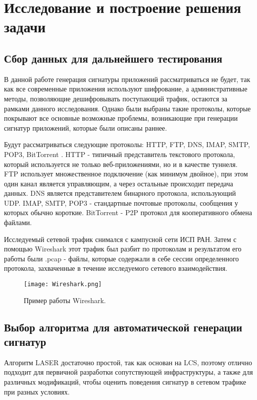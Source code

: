 \section{Исследование и построение решения задачи}
\label{sec:Section3} 

\subsection{Сбор данных для дальнейшего тестирования}

В данной работе генерация сигнатуры приложений рассматриваться не будет,
так как все современные приложения используют шифрование, а административные методы,
позволяющие дешифровывать поступающий трафик, остаются за рамками данного исследования.
Однако были выбраны такие протоколы, которые покрывают все основные возможные проблемы,
возникающие при генерации сигнатур приложений, которые были описаны раннее.

Будут рассматриваться следующие протоколы: HTTP, FTP, DNS, IMAP, SMTP, POP3, BitTorrent \cite{Bittorent}.
HTTP - типичный представитель текстового протокола, который используется не только веб-приложениями,
но и в качестве туннеля.
FTP использует множественное подключение (как минимум двойное), при этом один канал является управляющим,
а через остальные происходит передача данных. DNS является представителем бинарного протокола, использующий UDP.
IMAP, SMTP, POP3 - стандартные почтовые протоколы, сообщения у которых обычно короткие.
BitTorrent - P2P протокол для кооперативного обмена файлами.

Исследуемый сетевой трафик снимался с кампусной сети ИСП РАН. Затем с помощью Wireshark \cite{Wireshark}
этот трафик был разбит по протоколам и результатом его работы были .pcap - файлы,
которые содержали в себе сессии определенного протокола, захваченные в течение исследуемого сетевого взаимодействия.

\begin{figure}[H]
    \begin{center}
        \texttt{[image: Wireshark.png]}
        \caption{Пример работы Wireshark.}
    \end{center}
\end{figure}

\subsection{Выбор алгоритма для автоматической генерации сигнатур}
Алгоритм LASER достаточно простой, так как основан на LCS, поэтому отлично подходит для первичной разработки сопутствующей инфраструктуры,
а также для различных модификаций, чтобы оценить поведения сигнатур в сетевом трафике при разных условиях.


